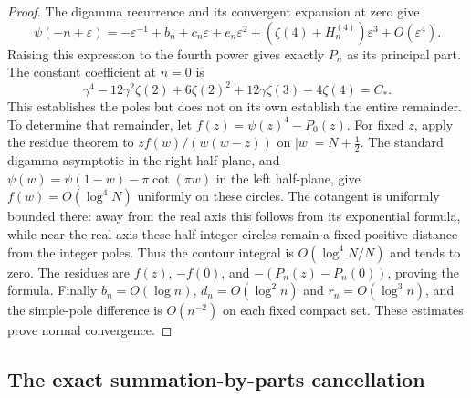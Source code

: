\documentclass[11pt]{article}
\numberwithin{equation}{section}
\theoremstyle{plain}
\theoremstyle{definition}
\theoremstyle{remark}
\begin{document}
\begin{proof}
The digamma recurrence and its convergent expansion at zero \cite{bhr:DLMFG} give
\[
 \psi(-n+\varepsilon)
   =-\varepsilon^{-1}+b_n+c_n\varepsilon+e_n\varepsilon^2
       +(\zeta(4)+H_n^{(4)})\varepsilon^3+O(\varepsilon^4).
\]
Raising this expression to the fourth power gives exactly $P_n$ as
its principal part. The constant coefficient at $n=0$ is
\[
 \gamma^4-12\gamma^2\zeta(2)+6\zeta(2)^2
                +12\gamma\zeta(3)-4\zeta(4)=C_*.
\]
This establishes the poles but does not on its own establish the entire
remainder. To determine that remainder, let $f(z)=\psi(z)^4-P_0(z)$.
For fixed $z$, apply the residue theorem to
$z f(w)/(w(w-z))$ on $|w|=N+\tfrac12$.
The standard digamma asymptotic in the right half-plane, and
$\psi(w)=\psi(1-w)-\pi\cot(\pi w)$ in the left half-plane, give
$f(w)=O(\log^4 N)$ uniformly on these circles. The cotangent is
uniformly bounded there: away from the real axis this follows from its
exponential formula, while near the real axis these half-integer circles
remain a fixed positive distance from the integer poles. Thus the
contour integral is $O(\log^4N/N)$ and tends to zero. The residues are
$f(z)$, $-f(0)$, and $-(P_n(z)-P_n(0))$, proving the formula.
Finally $b_n=O(\log n)$, $d_n=O(\log^2n)$ and
$r_n=O(\log^3n)$, and the simple-pole difference is $O(n^{-2})$
on each fixed compact set. These estimates prove normal convergence.
\end{proof}

\subsection{The exact summation-by-parts cancellation}
\end{document}
